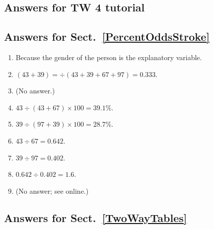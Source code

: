 \documentclass[
  11pt,
  a4paper,
  krantz2]{krantz}
\providecommand{\tightlist}{%
  \setlength{\itemsep}{0pt}\setlength{\parskip}{0pt}}
\begin{document}
\begin{footnotesize}
\section{Answers for TW 4 tutorial}\label{Lecture4Answers}

\subsection*{Answers for Sect.~\ref{PercentOddsStroke}}\label{answers-for-sect.-refpercentoddsstroke}

\begin{enumerate}
\def\labelenumi{\arabic{enumi}.}
\tightlist
\item
  Because the gender of the person is the explanatory variable.
\item
  \((43+39)=\div(43+39+67+97) = 0.333\).
\item
  (No answer.)
\item
  \(43\div (43 + 67) \times 100 = 39.1\)\%.
\item
  \(39\div (97 + 39) \times 100 = 28.7\)\%.
\item
  \(43\div 67 = 0.642\).
\item
  \(39\div 97 = 0.402\).
\item
  \(0.642 \div 0.402 = 1.6\).
\item
  (No answer; see online.)
\end{enumerate}

\subsection*{Answers for Sect.~\ref{TwoWayTables}}\label{answers-for-sect.-reftwowaytables}


\end{footnotesize}
\end{document}
